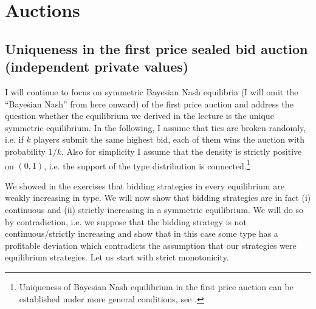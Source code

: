 \documentclass[a4paper,11pt]{article}
\begin{document}
\section{Auctions}
\label{sec:auctions}

\subsection{Uniqueness in the first price sealed bid auction (independent private values)}
\label{sec:uniq-first-price}

I will continue to focus on symmetric Bayesian Nash equilibria (I will omit the ``Bayesian Nash'' from here onward) of the first price auction and address the question whether the equilibrium we derived in the lecture is the unique symmetric equilibrium. In the following, I assume that ties are broken randomly, i.e. if $k$ players submit the same highest bid, each of them wins the auction with probability $1/k$. Also for simplicity I assume that the density is strictly positive on $(0,1)$, i.e. the support of the type distribution is connected.\footnote{Uniqueness of Bayesian Nash equilibrium in the first price auction can be established under more general conditions, see \cite{lebrun2006uniqueness}.} 

We showed in the exercises that bidding strategies in every equilibrium are weakly increasing in type. We will now show  that bidding strategies are in fact (i) continuous and (ii) strictly increasing in a symmetric equilibrium. We will do so by contradiction, i.e. we suppose that the bidding strategy is not continuous/strictly increasing and show that in this case some type has a profitable deviation which contradicts the assumption that our strategies were equilibrium strategies. Let us start with strict monotonicity.
\end{document}
